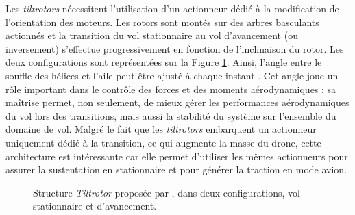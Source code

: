         Les \textit{tiltrotors} nécessitent l'utilisation d'un actionneur dédié à la modification de l'orientation des moteurs. Les rotors sont montés sur des arbres basculants actionnés et la transition du vol stationnaire au vol d'avancement (ou inversement) s'effectue progressivement en fonction de l'inclinaison du rotor. Les deux configurations sont représentées sur la Figure \ref{fig:tiltrotor}. Ainsi, l'angle entre le souffle des hélices et l'aile peut être ajusté à chaque instant \cite{9836063, du2024numerical, nie2024hierarchical, schlatter2024longitudinal}. Cet angle joue un rôle important dans le contrôle des forces et des moments aérodynamiques : sa maîtrise permet, non seulement, de mieux gérer les performances aérodynamiques du vol lors des transitions, mais aussi la stabilité du système sur l'ensemble du domaine de vol. 
        Malgré le fait que les \textit{tiltrotors} embarquent un actionneur uniquement dédié à la transition, ce qui augmente la masse du drone, cette architecture est intéressante car elle permet d'utiliser les mêmes actionneurs pour assurer la sustentation en stationnaire et pour générer la traction en mode avion.
        \begin{figure}[ht!]
            \centering
            \caption{Structure \textit{Tiltrotor}  proposée par \cite{7040348}, dans deux configurations, vol stationnaire et d'avancement.}
            \label{fig:tiltrotor}
        \end{figure}


        

